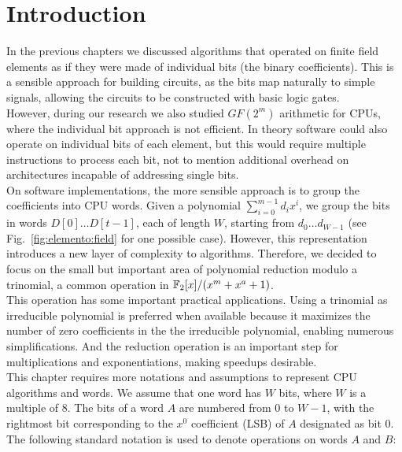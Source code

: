 \section{Introduction}

In the previous chapters we discussed algorithms that operated on finite field elements as if they were made of individual bits (the binary coefficients). This is a sensible approach for building circuits, as the bits map naturally to simple signals, allowing the circuits to be constructed with basic logic gates. \\

However, during our research we also studied $GF(2^m)$ arithmetic for CPUs, where the individual bit approach is not efficient. In theory software could also operate on individual bits of each element, but this would require multiple instructions to process each bit, not to mention additional overhead on architectures incapable of addressing single bits. \\

On software implementations, the more sensible approach is to group the coefficients into CPU words. Given a polynomial $\sum_{i=0}^{m-1} d_i x^i$, we group the bits in words $D[0] \ldots D[t-1]$, each of length $W$, starting from $d_0 \ldots d_{W-1}$ (see Fig.~\ref{fig:elemento:field} for one possible case). However, this representation introduces a new layer of complexity to algorithms. Therefore, we decided to focus on the small but important area of polynomial reduction modulo a trinomial, a common operation in $\mathbb{F}_2[x]/(x^m+x^a+1)$. \\

This operation has some important practical applications. Using a trinomial as irreducible polynomial is preferred when available because it maximizes the number of zero coefficients in the the irreducible polynomial, enabling numerous simplifications. And the reduction operation is an important step for multiplications and exponentiations, making speedups desirable.\\

This chapter requires more notations and assumptions to represent CPU algorithms and words. We assume that one word has $W$ bits, where $W$ is a multiple of $8$. The bits of a word $A$ are numbered from $0$ to $W-1$, with the rightmost bit corresponding to the $x^0$ coefficient (LSB) of $A$ designated as bit $0$. The following standard notation is used to denote operations on words $A$ and $B$:\\

